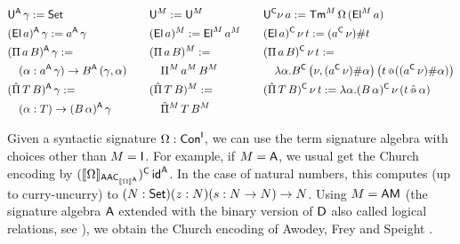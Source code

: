 \documentclass[a4paper,UKenglish,cleveref, autoref]{lipics-v2019}
\begin{document}
\begin{definition}
\begin{alignat*}{10}
    & \U^\A\,\gamma := \Set && && \U^M := \U^M && && \U^\C\nu\,a := \Tm^M\,\Omega\,(\El^M\,a) \\
    & (\El\,a)^\A\,\gamma := a^\A\,\gamma && && (\El\,a)^M := \El^M\,a^M && && (\El\,a)^\C\,\nu\,t := (a^\C\,\nu) \# t \\
    & (\Pi\,a\,B)^\A\,\gamma := && && (\Pi\,a\,B)^M := && && (\Pi\,a\,B)^\C\,\nu\,t :=  \\
    & \hspace{1em} (\alpha:a^\A\,\gamma)\ra B^\A\,(\gamma,\alpha) && && \hspace{1em} \Pi^M\,a^M\,B^M && && \hspace{1em} \lambda\alpha.B^\C\,\big(\nu, (a^\C\,\nu)\#\alpha\big)\,\big(t\oldapp ((a^\C\,\nu) \#\alpha)\big) \\
    & (\Pim\,T\,B)^\A\,\gamma := && && (\Pim\,T\,B)^M := && && (\Pim\,T\,B)^\C\,\nu\,t := \lambda\alpha.(B\,\alpha)^\C\,\nu\,(t\appm\alpha) \\
    & \hspace{1em} (\alpha:T)\ra(B\,\alpha)^\A\,\gamma && && \hspace{1em} \Pim^M\,T\,B^M && && 
  \end{alignat*}
\end{definition}

\begin{remark}
  Given a syntactic signature $\Omega : \mathsf{Con}^{\mathsf{I}}$, we can use the term
  signature algebra with choices other than $M = \mathsf{I}$. For example, if
  $M = \mathsf{A}$, we usual get the Church encoding by
  $(\llbracket\Omega\rrbracket_{{\mathsf{A}\mathsf{A}\mathsf{C}}_{\llbracket\Omega\rrbracket^{\mathsf{A}}}})^{\mathsf{C}}\,\mathsf{id}^{\mathsf{A}}$. In the
  case of natural numbers, this computes (up to curry-uncurry) to
  $(N:\mathsf{Set})(z:N)(s:N\rightarrow N)\rightarrow N$. Using $M = {\mathsf{A}\mathsf{M}}$ (the signature
  algebra $\mathsf{A}$ extended with the binary version of $\mathsf{D}$ also called
  logical relations, see \cite[Section
  5]{Kaposi:2019:CQI:3302515.3290315}), we obtain the Church encoding
  of Awodey, Frey and Speight \cite{DBLP:conf/lics/AwodeyFS18}.
\end{remark}
\end{document}
